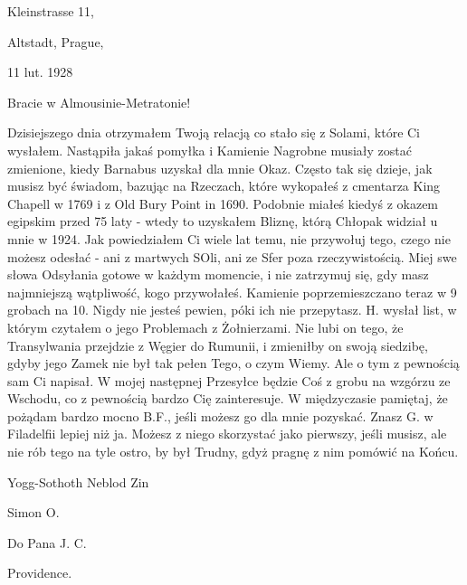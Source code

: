 \begin{displayquote}

\begin{flushright}
Kleinstrasse 11,

Altstadt, Prague,

11 lut. 1928
\end{flushright}

Bracie w Almousinie-Metratonie!

Dzisiejszego dnia otrzymałem Twoją relacją co stało się z Solami, które Ci wysłałem. Nastąpiła jakaś pomyłka i Kamienie Nagrobne musiały zostać zmienione, kiedy Barnabus uzyskał dla mnie Okaz. Często tak się dzieje, jak musisz być świadom, bazując na Rzeczach, które wykopałeś z cmentarza King Chapell w 1769 i z Old Bury Point in 1690. Podobnie miałeś kiedyś z okazem egipskim przed 75 laty - wtedy to uzyskałem Bliznę, którą Chłopak widział u mnie w 1924. Jak powiedziałem Ci wiele lat temu, nie przywołuj tego, czego nie możesz odesłać - ani z martwych SOli, ani ze Sfer poza rzeczywistością. Miej swe słowa Odsyłania gotowe w każdym momencie, i nie zatrzymuj się, gdy masz najmniejszą wątpliwość, kogo przywołałeś. Kamienie poprzemieszczano teraz w 9 grobach na 10. Nigdy nie jesteś pewien, póki ich nie przepytasz. H. wysłał list, w którym czytałem o jego Problemach z Żołnierzami. Nie lubi on tego, że Transylwania przejdzie z Węgier do Rumunii, i zmieniłby on swoją siedzibę, gdyby jego Zamek nie był tak pełen Tego, o czym Wiemy. Ale o tym z pewnością sam Ci napisał. W mojej następnej Przesyłce będzie Coś z grobu na wzgórzu ze Wschodu, co z pewnością bardzo Cię zainteresuje. W międzyczasie pamiętaj, że pożądam bardzo mocno B.F., jeśli możesz go dla mnie pozyskać. Znasz G. w Filadelfii lepiej niż ja. Możesz z niego skorzystać jako pierwszy, jeśli musisz, ale nie rób tego na tyle ostro, by był Trudny, gdyż pragnę z nim pomówić na Końcu.

\begin{flushright}
Yogg-Sothoth Neblod Zin

Simon O.
\end{flushright}

Do Pana J. C.

Providence.

\end{displayquote}

